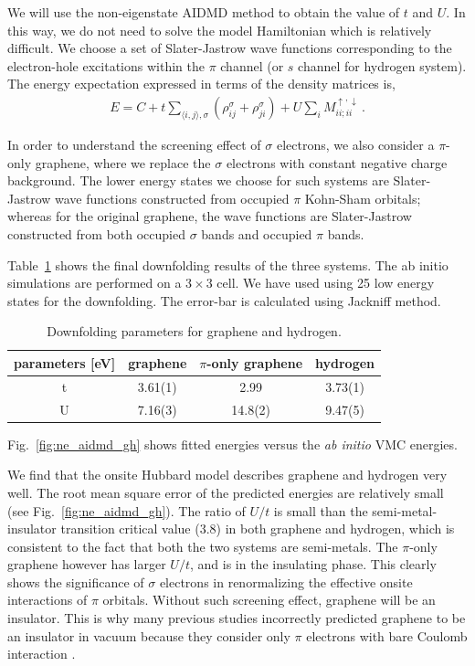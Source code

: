 \documentclass[prl,12pt,onecolumn,nofootinbib,notitlepage,english,superscriptaddress]{revtex4-1}
\begin{document}
We will use the non-eigenstate AIDMD method to obtain the value of $t$ and $U$. In this way, we do not need to solve the model Hamiltonian which is relatively difficult. We choose a set of Slater-Jastrow wave functions corresponding to the electron-hole excitations within the $\pi$ channel (or $s$ channel for hydrogen system). The energy expectation expressed in terms of the density matrices is, 
\begin{eqnarray}\label{eq:en}
E = C + t\sum_{\langle i, j\rangle, \sigma}( \rho_{ij}^\sigma + \rho_{ji}^\sigma) + U \sum_{i}M_{ii;ii}^{\uparrow,\downarrow}\,.
\end{eqnarray}

In order to understand the screening effect of $\sigma$ electrons, we also consider a $\pi$-only graphene, where we replace the $\sigma$ electrons with constant negative charge background. The lower energy states we choose for such systems are Slater-Jastrow wave functions constructed from occupied $\pi$ Kohn-Sham orbitals; whereas for the original graphene, the wave functions are Slater-Jastrow constructed from both occupied $\sigma$ bands and occupied $\pi$ bands. 

Table~\ref{tab:grpheffm} shows the final downfolding results of the three systems. The ab initio simulations are performed on a $3\times3$ cell. We have used using 25 low energy states for the downfolding. The error-bar is calculated using Jackniff method. 

\begin{table}[ht]
\label{tab:grpheffm}
\centering
\begin{tabular}{|c|c|c|c|}
\hline
parameters [eV] & graphene & $\pi$-only graphene &hydrogen \\
\hline
\hline
t & 3.61(1) & 2.99 & 3.73(1)\\
U & 7.16(3) & 14.8(2) & 9.47(5)\\
\hline
\end{tabular}
\caption{Downfolding parameters for graphene and hydrogen.}
\end{table} 
Fig.~\ref{fig:ne_aidmd_gh} shows fitted energies versus the \textit{ab initio} VMC energies. 

We find that the onsite Hubbard model describes graphene and hydrogen very well. The root mean square error of the predicted energies are relatively small (see Fig.~\ref{fig:ne_aidmd_gh}). The ratio of $U/t$ is small than the semi-metal-insulator transition critical value (3.8) in both graphene and hydrogen, which is consistent to the fact that both the two systems are semi-metals.  The $\pi$-only graphene however has larger $U/t$, and is in the insulating phase. This clearly shows the significance of $\sigma$ electrons in renormalizing the effective onsite interactions of $\pi$ orbitals. Without such screening effect, graphene will be an insulator. This is why many previous studies incorrectly predicted graphene to be an insulator in vacuum because they consider only $\pi$ electrons with bare Coulomb interaction \cite{DrutPRL2009, DrutPRB2009,  Smith2014}.
\end{document}
